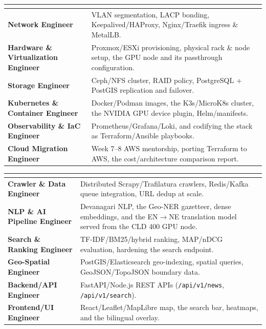 \documentclass[10pt, a4paper]{article}
\begin{document}
\begin{table}[H]
\centering
\small
\renewcommand{\arraystretch}{1.25}
\begin{tabularx}{\textwidth}{|>{\bfseries}l|X|}
\hline
\rowcolor{lightgray}
\multicolumn{2}{|c|}{\textbf{CLD 400 Engineering Roles}} \\ \hline
Network Engineer & VLAN segmentation, LACP bonding, Keepalived/HAProxy, Nginx/Traefik ingress \& MetalLB. \\ \hline
Hardware \& Virtualization Engineer & Proxmox/ESXi provisioning, physical rack \& node setup, the GPU node and its passthrough configuration. \\ \hline
Storage Engineer & Ceph/NFS cluster, RAID policy, PostgreSQL + PostGIS replication and failover. \\ \hline
Kubernetes \& Container Engineer & Docker/Podman images, the K3s/MicroK8s cluster, the NVIDIA GPU device plugin, Helm/manifests. \\ \hline
Observability \& IaC Engineer & Prometheus/Grafana/Loki, and codifying the stack as Terraform/Ansible playbooks. \\ \hline
Cloud Migration Engineer & Week 7--8 AWS mentorship, porting Terraform to AWS, the cost/architecture comparison report. \\ \hline
\end{tabularx}

\vspace{0.6em}

\begin{tabularx}{\textwidth}{|>{\bfseries}l|X|}
\hline
\rowcolor{lightgray}
\multicolumn{2}{|c|}{\textbf{TECH 400 Engineering Roles}} \\ \hline
Crawler \& Data Engineer & Distributed Scrapy/Trafilatura crawlers, Redis/Kafka queue integration, URL dedup at scale. \\ \hline
NLP \& AI Pipeline Engineer & Devanagari NLP, the Geo-NER gazetteer, dense embeddings, and the EN$\to$NE translation model served from the CLD 400 GPU node. \\ \hline
Search \& Ranking Engineer & TF-IDF/BM25/hybrid ranking, MAP/nDCG evaluation, hardening the search endpoint. \\ \hline
Geo-Spatial Engineer & PostGIS/Elasticsearch geo-indexing, spatial queries, GeoJSON/TopoJSON boundary data. \\ \hline
Backend/API Engineer & FastAPI/Node.js REST APIs (\texttt{/api/v1/news}, \texttt{/api/v1/search}). \\ \hline
Frontend/UI Engineer & React/Leaflet/MapLibre map, the search bar, heatmaps, and the bilingual overlay. \\ \hline
\end{tabularx}
\end{table}
\end{document}

